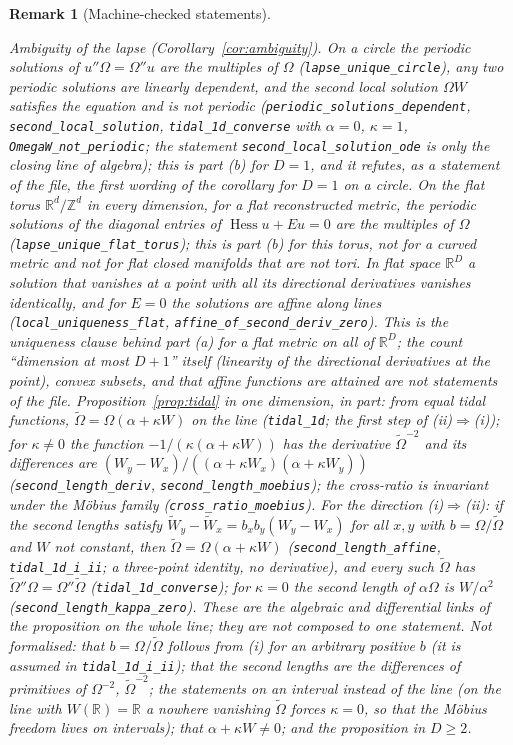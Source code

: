 \documentclass[11pt,a4paper]{article}
\theoremstyle{stmt}
\theoremstyle{defn}
\theoremstyle{rmk}
\newtheorem{remark}[theorem]{Remark}
\numberwithin{equation}{section}
\newcommand{\R}{\mathbb{R}}
\begin{document}
{\begin{remark}[Machine-checked statements]
\begin{itemize}
\emph{Ambiguity of the lapse (Corollary~\ref{cor:ambiguity}).} On a circle the periodic solutions of $u''\Omega=\Omega''u$ are the multiples of $\Omega$ (\texttt{lapse\_unique\_circle}), any two periodic solutions are linearly dependent, and the second local solution $\Omega W$ satisfies the equation and is not periodic (\texttt{periodic\_solutions\_dependent}, \texttt{second\_local\_solution}, \texttt{tidal\_1d\_converse} with $\alpha=0$, $\kappa=1$, \texttt{OmegaW\_not\_periodic}; the statement \texttt{second\_local\_solution\_ode} is only the closing line of algebra); this is part (b) for $D=1$, and it refutes, as a statement of the file, the first wording of the corollary for $D=1$ on a circle. On the flat torus $\R^d/\mathbb Z^d$ in every dimension, for a flat reconstructed metric, the periodic solutions of the diagonal entries of $\operatorname{Hess}u+Eu=0$ are the multiples of $\Omega$ (\texttt{lapse\_unique\_flat\_torus}); this is part (b) for this torus, not for a curved metric and not for flat closed manifolds that are not tori. In flat space $\R^D$ a solution that vanishes at a point with all its directional derivatives vanishes identically, and for $E=0$ the solutions are affine along lines (\texttt{local\_uniqueness\_flat}, \texttt{affine\_of\_second\_deriv\_zero}). This is the uniqueness clause behind part (a) for a flat metric on all of $\R^D$; the count ``dimension at most $D+1$'' itself (linearity of the directional derivatives at the point), convex subsets, and that affine functions are attained are not statements of the file.
\emph{Proposition~\ref{prop:tidal} in one dimension,} in part: from equal tidal functions, $\tilde\Omega=\Omega(\alpha+\kappa W)$ on the line (\texttt{tidal\_1d}; the first step of (ii)$\Rightarrow$(i)); for $\kappa\ne0$ the function $-1/(\kappa(\alpha+\kappa W))$ has the derivative $\tilde\Omega^{-2}$ and its differences are $(W_y-W_x)/((\alpha+\kappa W_x)(\alpha+\kappa W_y))$ (\texttt{second\_length\_deriv}, \texttt{second\_length\_moebius}); the cross-ratio is invariant under the M\"obius family (\texttt{cross\_ratio\_moebius}). For the direction (i)$\Rightarrow$(ii): if the second lengths satisfy $\tilde W_y-\tilde W_x=b_xb_y(W_y-W_x)$ for all $x,y$ with $b=\Omega/\tilde\Omega$ and $W$ not constant, then $\tilde\Omega=\Omega(\alpha+\kappa W)$ (\texttt{second\_length\_affine}, \texttt{tidal\_1d\_i\_ii}; a three-point identity, no derivative), and every such $\tilde\Omega$ has $\tilde\Omega''\Omega=\Omega''\tilde\Omega$ (\texttt{tidal\_1d\_converse}); for $\kappa=0$ the second length of $\alpha\Omega$ is $W/\alpha^2$ (\texttt{second\_length\_kappa\_zero}). These are the algebraic and differential links of the proposition on the whole line; they are not composed to one statement. Not formalised: that $b=\Omega/\tilde\Omega$ follows from (i) for an arbitrary positive $b$ (it is assumed in \texttt{tidal\_1d\_i\_ii}); that the second lengths are the differences of primitives of $\Omega^{-2}$, $\tilde\Omega^{-2}$; the statements on an interval instead of the line (on the line with $W(\R)=\R$ a nowhere vanishing $\tilde\Omega$ forces $\kappa=0$, so that the M\"obius freedom lives on intervals); that $\alpha+\kappa W\ne0$; and the proposition in $D\ge2$.

\end{itemize}
\end{remark}}
\end{document}
